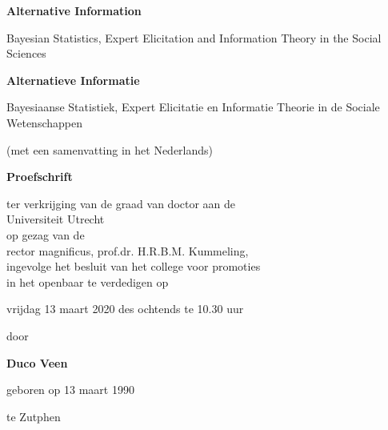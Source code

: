 \documentclass[openright,titlepage,12pt,a4paper]{book}
\title{}
\author{Duco Veen}
\date{Department of Methodology \& Statistics, Utrecht University}
\begin{document}

\begin{center}
\huge{\textbf{Alternative Information}}


\Large{Bayesian Statistics, Expert Elicitation and Information Theory in the Social Sciences}

\vspace*{1cm}

\large{\textbf{Alternatieve Informatie}}

\normalsize{Bayesiaanse Statistiek, Expert Elicitatie en Informatie Theorie in de Sociale Wetenschappen}

\vspace*{.3cm}

\normalsize{(met een samenvatting in het Nederlands)}



\vspace*{2cm}

\Large{\textbf{Proefschrift}}

\vspace*{3cm}

\normalsize

ter verkrijging van de graad van doctor aan de \\
Universiteit Utrecht \\
op gezag van de \\
rector magnificus, prof.dr. H.R.B.M. Kummeling, \\
ingevolge het besluit van het college voor promoties \\
in het openbaar te verdedigen op

\vspace*{.5cm}

vrijdag 13 maart 2020 des ochtends te 10.30 uur


\vspace*{1.5cm}

door


\vspace*{1.5cm}

\Large{\textbf{Duco Veen}}
\normalsize

\vspace*{1cm}

geboren op 13 maart 1990

te Zutphen

\end{center}

\end{document}
